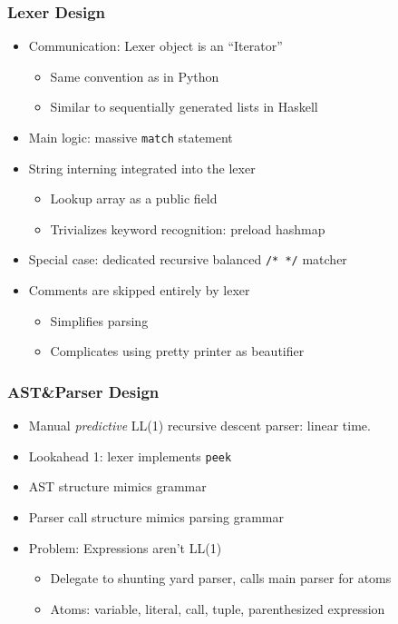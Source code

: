 \documentclass{beamer}
\begin{document}
\begin{frame}
    \frametitle{Lexer Design}
    \begin{itemize}[<+(1)->]
        \item Communication: Lexer object is an ``Iterator''
            \begin{itemize}[<+(1)->]
                \item Same convention as in Python
                \item Similar to sequentially generated lists in Haskell
            \end{itemize}
        \item Main logic: massive \texttt{match} statement
        \item String interning integrated into the lexer
            \begin{itemize}[<+(1)->]
                \item Lookup array as a public field
                \item Trivializes keyword recognition: preload hashmap
            \end{itemize}
        \item Special case: dedicated recursive balanced \texttt{/* */} matcher
        \item Comments are skipped entirely by lexer
            \begin{itemize}[<+(1)->]
                \item Simplifies parsing
                \item Complicates using pretty printer as beautifier
            \end{itemize}
    \end{itemize}
\end{frame}

\begin{frame}
    \frametitle{AST\&Parser Design}
    \begin{itemize}[<+(1)->]
        \item Manual \textit{predictive} LL(1) recursive descent parser: linear
            time.
        \item Lookahead 1: lexer implements \texttt{peek}
        \item AST structure mimics grammar
        \item Parser call structure mimics parsing grammar
        \item Problem: Expressions aren't LL(1) 
            \begin{itemize}[<+(1)->]
                \item Delegate to shunting yard parser, calls main parser for atoms
                \item Atoms: variable, literal, call, tuple, parenthesized expression
            \end{itemize}
    \end{itemize}
\end{frame}
\end{document}
